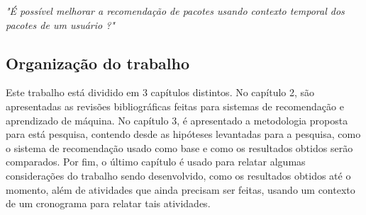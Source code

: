 \textit{"É possível melhorar a recomendação de pacotes usando contexto temporal
dos pacotes de um usuário ?"}

\subsection{Organização do trabalho}

Este trabalho está dividido em 3 capítulos distintos. No capítulo 2,
são apresentadas as revisões bibliográficas feitas para sistemas de recomendação e aprendizado de máquina.
No capítulo 3, é apresentado a metodologia proposta para está pesquisa, contendo desde as hipóteses levantadas para a pesquisa,
 como o sistema de recomendação usado como base e como os resultados obtidos serão comparados. Por fim, o último capítulo é usado para relatar
algumas considerações do trabalho sendo desenvolvido, como os resultados obtidos até o momento, além de atividades que ainda precisam ser feitas, 
usando um contexto de um cronograma para relatar tais atividades.

